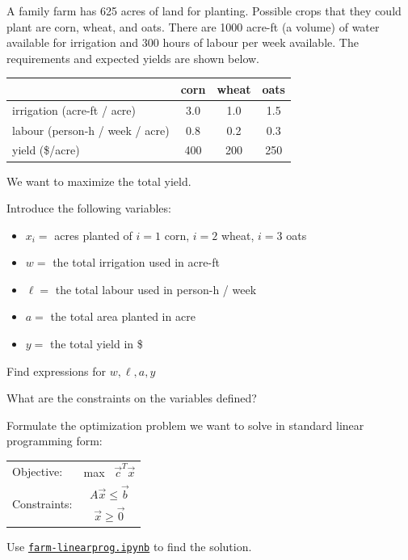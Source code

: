 \documentclass{workbook}
\begin{document}
\begin{slide}
\question

\begin{problem}
	A family farm has 625 acres of land for planting. Possible crops that they could plant are corn, wheat, and oats. There are 1000 acre-ft (a volume) of water available for irrigation and 300 hours of labour per week available. The requirements and expected yields are shown below.
	
	\begin{center}
	\small
	\begin{tabular}{l|c|c|c}
	& corn & wheat & oats \\ \hline
	irrigation (acre-ft / acre) & 3.0 & 1.0 & 1.5 \\ \hline
	labour (person-h / week / acre) & 0.8 & 0.2 & 0.3 \\ \hline
	yield (\$/acre) & 400 & 200 & 250 \\ %
	\end{tabular}
	\end{center}
	
	We want to maximize the total yield.
\end{problem}

Introduce the following variables:
\begin{itemize}
	\item $x_i= $ acres planted of $i=1$ corn, $i=2$ wheat, $i=3$ oats
	\item $w=$ the total irrigation used in acre-ft
	\item $\ell=$ the total labour used in person-h / week
	\item $a=$ the total area planted in acre
	\item $y=$ the total yield in \$
\end{itemize}

\begin{parts}
	\item Find expressions for $w, \ell, a, y$
	\item What are the constraints on the variables defined?	
	\item Formulate the optimization problem we want to solve in standard linear programming form:
	\begin{center}
		\begin{tabular}{lc}
		Objective: 		& max \ $\vec{c}^T \vec{x}$ \\
		\multirow{2}{*}{Constraints:} 	& $A \vec{x} \leq \vec{b}$ \\
						& $\vec{x} \geq \vec{0}$
		\end{tabular}
	\end{center}
	\item Use \href{https://utoronto.syzygy.ca/jupyter/user-redirect/git-pull?repo=https://github.com/bigfatbernie/IBLMathModeling&subPath=python/farm-linearprog.ipynb}{\tt farm-linearprog.ipynb} to find the solution.

\end{parts}

\end{slide}
\end{document}
